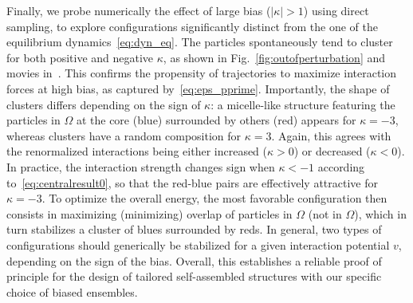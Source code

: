 \documentclass[superscriptaddress, twocolumn, prx, longbibliography, nofootinbib]{revtex4-1}
\begin{document}
Finally, we probe numerically the effect of large bias ($|\kappa|>1$) using direct sampling, to explore configurations significantly distinct from the one of the equilibrium dynamics~\eqref{eq:dyn_eq}. The particles spontaneously tend to cluster for both positive and negative $\kappa$, as shown in Fig.~\ref{fig:outofperturbation} and movies in~\cite{movie}. This confirms the propensity of trajectories to maximize interaction forces at high bias, as captured by~\eqref{eq:eps_pprime}. Importantly, the shape of clusters differs depending on the sign of $\kappa$: a micelle-like structure featuring the particles in $\Omega$ at the core (blue) surrounded by others (red) appears for $\kappa=-3$, whereas clusters have a random composition for $\kappa=3$. Again, this agrees with the renormalized interactions being either increased ($\kappa>0$) or decreased ($\kappa<0$). In practice, the interaction strength changes sign when $\kappa<-1$ according to~\eqref{eq:centralresult0}, so that the red-blue pairs are effectively attractive for $\kappa=-3$. To optimize the overall energy, the most favorable configuration then consists in maximizing (minimizing) overlap of particles in $\Omega$ (not in $\Omega$), which in turn stabilizes a cluster of blues surrounded by reds. In general, two types of configurations should generically be stabilized for a given interaction potential $v$, depending on the sign of the bias. Overall, this establishes a reliable proof of principle for the design of tailored self-assembled structures with our specific choice of biased ensembles.


\end{document}
